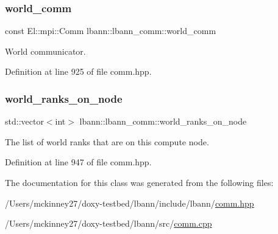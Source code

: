 \subsubsection{\texorpdfstring{world\+\_\+comm}{world\_comm}}
{\footnotesize\ttfamily const El\+::mpi\+::\+Comm lbann\+::lbann\+\_\+comm\+::world\+\_\+comm\hspace{0.3cm}{\ttfamily [private]}}

World communicator. 

Definition at line 925 of file comm.\+hpp.

\mbox{\label{classlbann_1_1lbann__comm_a3299a37fe7b0eae43a5c154148ab6dc2}} 
\subsubsection{\texorpdfstring{world\+\_\+ranks\+\_\+on\+\_\+node}{world\_ranks\_on\_node}}
{\footnotesize\ttfamily std\+::vector$<$int$>$ lbann\+::lbann\+\_\+comm\+::world\+\_\+ranks\+\_\+on\+\_\+node\hspace{0.3cm}{\ttfamily [private]}}

The list of world ranks that are on this compute node. 

Definition at line 947 of file comm.\+hpp.



The documentation for this class was generated from the following files\+:\begin{DoxyCompactItemize}
\item 
/\+Users/mckinney27/doxy-\/testbed/lbann/include/lbann/\hyperlink{comm_8hpp}{comm.\+hpp}\item 
/\+Users/mckinney27/doxy-\/testbed/lbann/src/\hyperlink{comm_8cpp}{comm.\+cpp}\end{DoxyCompactItemize}
